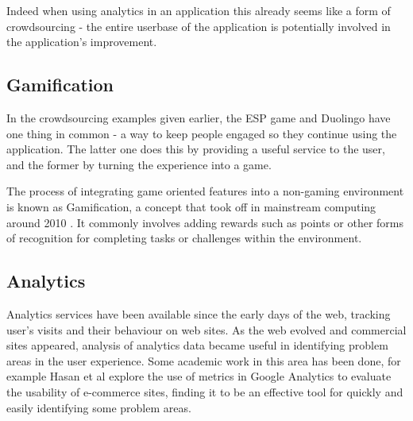 Indeed when using analytics in an application this already seems like a form of
crowdsourcing - the entire userbase of the application is potentially involved
in the application's improvement. 

\subsection{Gamification}

In the crowdsourcing examples given earlier, the ESP game and Duolingo have one
thing in common - a way to keep people engaged so they continue using the
application. The latter one does this by providing a useful service to the
user, and the former by turning the experience into a game.

The process of integrating game oriented features into a non-gaming environment
is known as Gamification, a concept that took off in mainstream computing
around 2010 \cite{gamification-trends}. It commonly involves adding rewards
such as points or other forms of recognition for completing tasks or challenges
within the environment.

\subsection{Analytics}

Analytics services have been available since the early days of the web,
tracking user's visits and their behaviour on web sites. As the web evolved and
commercial sites appeared, analysis of analytics data became useful in
identifying problem areas in the user experience. Some academic work in this
area has been done, for example Hasan et al \cite{hasan2009using} explore the
use of metrics in Google Analytics to evaluate the usability of e-commerce
sites, finding it to be an effective tool for quickly and easily identifying
some problem areas.

